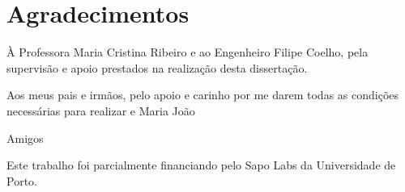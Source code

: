 \chapter*{Agradecimentos}
À Professora Maria Cristina Ribeiro e ao Engenheiro Filipe Coelho, pela supervisão e apoio prestados na realização desta dissertação.

Aos meus pais e irmãos, pelo apoio e carinho por me darem todas as condições necessárias para realizar e Maria João

Amigos

Este trabalho foi parcialmente financiando pelo Sapo Labs da Universidade de Porto.
\vspace{10mm}
